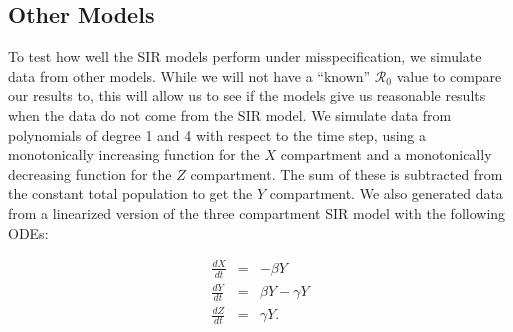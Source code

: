 \documentclass[12pt]{article}
\newcommand{\rr}{\ensuremath{\mathcal{R}_0}}
\begin{document}
\begin{table}[h]
	\centering
	\caption{Table of data sets.}
	\label{tab:datasets}
\end{table}

\subsection{Other Models}

To test how well the SIR models perform under misspecification, we simulate data from other models. While we will not have a ``known'' $\rr$ value to compare our results to, this will allow us to see if the models give us reasonable results when the data do not come from the SIR model. We simulate data from polynomials of degree 1 and 4 with respect to the time step, using a monotonically increasing function for the $X$ compartment and a monotonically decreasing function for the $Z$ compartment. The sum of these is subtracted from the constant total population to get the $Y$ compartment. We also generated data from a linearized version of the three compartment SIR model with the following ODEs:

\begin{eqnarray*}
	\frac{dX}{dt} &=& -\beta Y \\
	\frac{dY}{dt} &=& \beta Y - \gamma Y \\
	\frac{dZ}{dt} &=& \gamma Y.
\end{eqnarray*}
\end{document}
